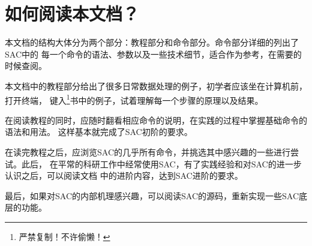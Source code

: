 \section{如何阅读本文档？}

本文档的结构大体分为两个部分：教程部分和命令部分。命令部分详细的列出了SAC中的
每一个命令的语法、参数以及一些技术细节，适合作为参考，在需要的时候查阅。

本文档中的教程部分给出了很多日常数据处理的例子，初学者应该坐在计算机前，打开终端，
键入\footnote{严禁复制！不许偷懒！}书中的例子，试着理解每一个步骤的原理以及结果。

在阅读教程的同时，应随时翻看相应命令的说明，在实践的过程中掌握基础命令的语法和用法。
这样基本就完成了SAC初阶的要求。

在读完教程之后，应浏览SAC的几乎所有命令，并挑选其中感兴趣的一些进行尝试。此后，
在平常的科研工作中经常使用SAC，有了实践经验和对SAC的进一步认识之后，可以阅读文档
中的进阶内容，达到SAC进阶的要求。

最后，如果对SAC的内部机理感兴趣，可以阅读SAC的源码，重新实现一些SAC底层的功能。
